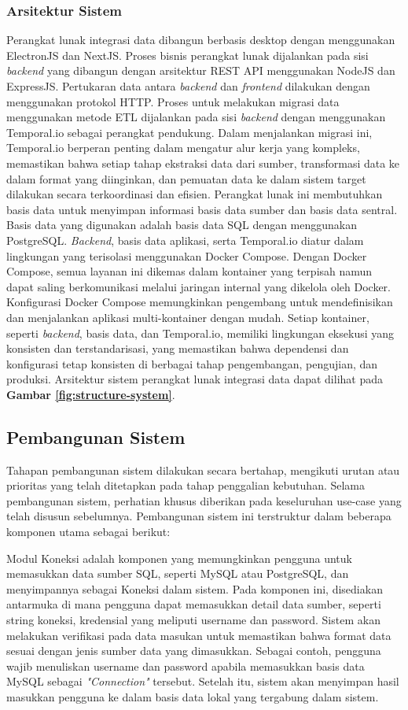 \subsubsection{Arsitektur Sistem}
Perangkat lunak integrasi data dibangun berbasis desktop dengan menggunakan ElectronJS dan NextJS. Proses bisnis perangkat lunak dijalankan pada sisi \emph{backend} yang dibangun dengan arsitektur REST API menggunakan NodeJS dan ExpressJS. Pertukaran data antara \emph{backend} dan \emph{frontend} dilakukan dengan menggunakan protokol HTTP. Proses untuk melakukan migrasi data menggunakan metode ETL dijalankan pada sisi \emph{backend} dengan menggunakan Temporal.io sebagai perangkat pendukung. Dalam menjalankan migrasi ini, Temporal.io berperan penting dalam mengatur alur kerja yang kompleks, memastikan bahwa setiap tahap ekstraksi data dari sumber, transformasi data ke dalam format yang diinginkan, dan pemuatan data ke dalam sistem target dilakukan secara terkoordinasi dan efisien. Perangkat lunak ini membutuhkan basis data untuk menyimpan informasi basis data sumber dan basis data sentral. Basis data yang digunakan adalah basis data SQL dengan menggunakan PostgreSQL. \emph{Backend}, basis data aplikasi, serta Temporal.io diatur dalam lingkungan yang terisolasi menggunakan Docker Compose. Dengan Docker Compose, semua layanan ini dikemas dalam kontainer yang terpisah namun dapat saling berkomunikasi melalui jaringan internal yang dikelola oleh Docker. Konfigurasi Docker Compose memungkinkan pengembang untuk mendefinisikan dan menjalankan aplikasi multi-kontainer dengan mudah. Setiap kontainer, seperti \emph{backend}, basis data, dan Temporal.io, memiliki lingkungan eksekusi yang konsisten dan terstandarisasi, yang memastikan bahwa dependensi dan konfigurasi tetap konsisten di berbagai tahap pengembangan, pengujian, dan produksi. Arsitektur sistem perangkat lunak integrasi data dapat dilihat pada \textbf{Gambar \ref{fig:structure-system}}.


\subsection{Pembangunan Sistem}
Tahapan pembangunan sistem dilakukan secara bertahap, mengikuti urutan atau prioritas yang telah ditetapkan pada tahap penggalian kebutuhan. Selama pembangunan sistem, perhatian khusus diberikan pada keseluruhan use-case yang telah disusun sebelumnya. Pembangunan sistem ini terstruktur dalam beberapa komponen utama sebagai berikut:

Modul Koneksi adalah komponen yang memungkinkan pengguna untuk memasukkan data sumber SQL, seperti MySQL atau PostgreSQL, dan menyimpannya sebagai Koneksi dalam sistem. Pada komponen ini, disediakan antarmuka di mana pengguna dapat memasukkan detail data sumber, seperti string koneksi, kredensial yang meliputi username dan password. Sistem akan melakukan verifikasi pada data masukan untuk memastikan bahwa format data sesuai dengan jenis sumber data yang dimasukkan. Sebagai contoh, pengguna wajib menuliskan username dan password apabila memasukkan basis data MySQL sebagai \emph{"Connection"} tersebut. Setelah itu, sistem akan menyimpan hasil masukkan pengguna ke dalam basis data lokal yang tergabung dalam sistem.

